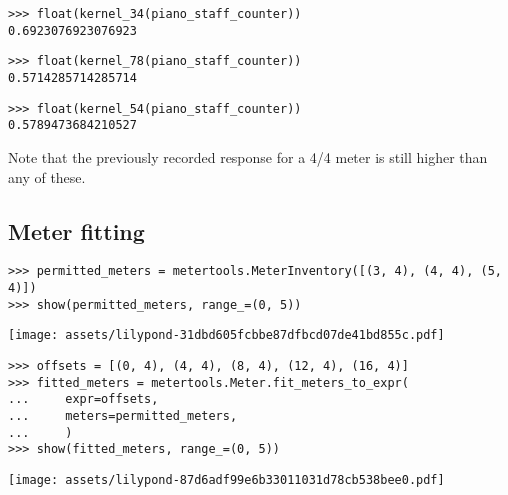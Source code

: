 \begin{singlespacing}
\vspace{-0.5\baselineskip}
\begin{lstlisting}
>>> float(kernel_34(piano_staff_counter))
0.6923076923076923
\end{lstlisting}
\begin{lstlisting}
>>> float(kernel_78(piano_staff_counter))
0.5714285714285714
\end{lstlisting}
\begin{lstlisting}
>>> float(kernel_54(piano_staff_counter))
0.5789473684210527
\end{lstlisting}
\end{singlespacing}

\noindent Note that the previously recorded response for a 4/4 meter is still
higher than any of these.

\subsection{Meter fitting} %

\begin{comment}
<abjad>
permitted_meters = metertools.MeterInventory([(3, 4), (4, 4), (5, 4)])
show(permitted_meters, range_=(0, 5))
</abjad>
\end{comment}

\begin{singlespacing}
\vspace{-0.5\baselineskip}
\begin{lstlisting}
>>> permitted_meters = metertools.MeterInventory([(3, 4), (4, 4), (5, 4)])
>>> show(permitted_meters, range_=(0, 5))
\end{lstlisting}
\noindent\texttt{[image: assets/lilypond-31dbd605fcbbe87dfbcd07de41bd855c.pdf]}
\end{singlespacing}

\begin{comment}
<abjad>
offsets = [(0, 4), (4, 4), (8, 4), (12, 4), (16, 4)]
fitted_meters = metertools.Meter.fit_meters_to_expr(
    expr=offsets,
    meters=permitted_meters,
    )
show(fitted_meters, range_=(0, 5))
</abjad>
\end{comment}

\begin{singlespacing}
\vspace{-0.5\baselineskip}
\begin{lstlisting}
>>> offsets = [(0, 4), (4, 4), (8, 4), (12, 4), (16, 4)]
>>> fitted_meters = metertools.Meter.fit_meters_to_expr(
...     expr=offsets,
...     meters=permitted_meters,
...     )
>>> show(fitted_meters, range_=(0, 5))
\end{lstlisting}
\noindent\texttt{[image: assets/lilypond-87d6adf99e6b33011031d78cb538bee0.pdf]}
\end{singlespacing}

